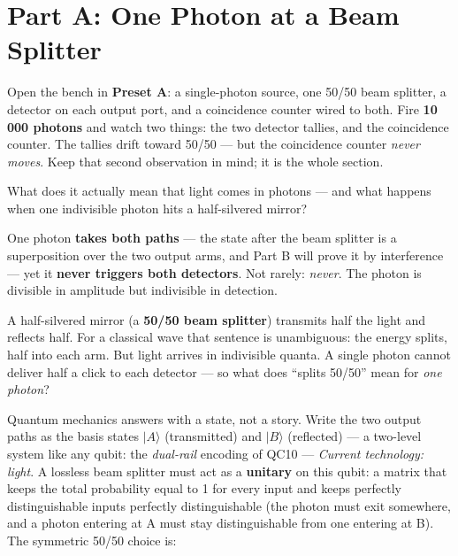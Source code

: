 \documentclass[a4paper,11pt]{article}
\providecommand{\ket}[1]{|#1\rangle}
\begin{document}
\newpage

\section{Part A: One Photon at a Beam Splitter}

\begin{benchbox}
Open the bench in \textbf{Preset A}: a single-photon source, one 50/50 beam splitter,
a detector on each output port, and a coincidence counter wired to both. Fire
\textbf{10\,000 photons} and watch two things: the two detector tallies, and the
coincidence counter. The tallies drift toward 50/50 --- but the coincidence counter
\emph{never moves}. Keep that second observation in mind; it is the whole section.
\end{benchbox}

\begin{questionbox}
What does it actually mean that light comes in photons --- and what happens when one
indivisible photon hits a half-silvered mirror?
\end{questionbox}

\begin{shockbox}
One photon \textbf{takes both paths} --- the state after the beam splitter is a
superposition over the two output arms, and Part B will prove it by interference ---
yet it \textbf{never triggers both detectors}. Not rarely: \emph{never}. The photon
is divisible in amplitude but indivisible in detection.
\end{shockbox}

A half-silvered mirror (a \textbf{50/50 beam splitter}) transmits half the light and
reflects half. For a classical wave that sentence is unambiguous: the energy splits,
half into each arm. But light arrives in indivisible quanta. A single photon cannot
deliver half a click to each detector --- so what does ``splits 50/50'' mean for
\emph{one photon}?

Quantum mechanics answers with a state, not a story. Write the two output paths as
the basis states $\ket{A}$ (transmitted) and $\ket{B}$ (reflected) --- a two-level
system like any qubit: the \emph{dual-rail} encoding of QC10 --- \textit{Current
technology: light}. A lossless beam splitter must act as a \textbf{unitary} on this
qubit: a matrix that keeps the total probability equal to 1 for every input and keeps
perfectly distinguishable inputs perfectly distinguishable (the photon must exit
somewhere, and a photon entering at A must stay distinguishable from one entering at
B). The symmetric 50/50 choice is:
\end{document}
